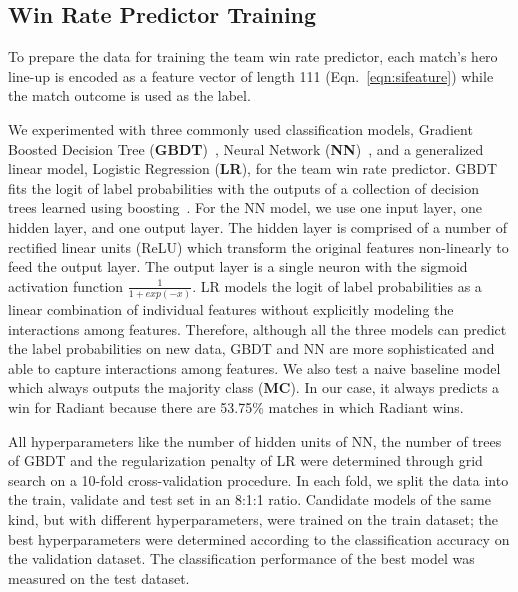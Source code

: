 \subsection{Win Rate Predictor Training}


To prepare the data for training the team win rate predictor, each match's hero line-up is encoded as a feature vector of length 111 (Eqn.~\ref{eqn:sifeature}) while the match outcome is used as the label. 

We experimented with three commonly used classification models, Gradient Boosted Decision Tree (\textbf{GBDT})~\citep{friedman2001greedy}, Neural Network (\textbf{NN})~\citep{bishop2006pattern}, and a generalized linear model, Logistic Regression (\textbf{LR}), for the team win rate predictor. GBDT fits the logit of label probabilities with the outputs of a collection of decision trees learned using boosting~\citep{friedman2000additive}. For the NN model, we use one input layer, one hidden layer, and one output layer. The hidden layer is comprised of a number of rectified linear units (ReLU) which transform the original features non-linearly to feed the output layer. The output layer is a single neuron with the sigmoid activation function $\frac{1}{1+exp(-x)}$. 
LR models the logit of label probabilities as a linear combination of individual features without explicitly modeling the interactions among features. Therefore, although all the three models can predict the label probabilities on new data, GBDT and NN are more sophisticated and able to capture interactions among features. We also test a naive baseline model which always outputs the majority class (\textbf{MC}). In our case, it always predicts a win for Radiant because there are 53.75\%  matches in which Radiant wins. 


All hyperparameters like the number of hidden units of NN, the number of trees of GBDT and the regularization penalty of LR were determined through grid search on a 10-fold cross-validation procedure. In each fold, we split the data into the train, validate and test set in an 8:1:1 ratio. Candidate models of the same kind, but with different hyperparameters, were trained on the train dataset; the best hyperparameters were determined according to the classification accuracy on the validation dataset. The classification performance of the best model was measured on the test dataset.  

